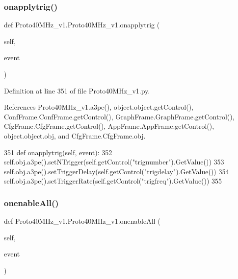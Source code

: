 \subsubsection{\texorpdfstring{onapplytrig()}{onapplytrig()}}
{\footnotesize\ttfamily def Proto40\+M\+Hz\+\_\+v1.\+Proto40\+M\+Hz\+\_\+v1.\+onapplytrig (\begin{DoxyParamCaption}\item[{}]{self,  }\item[{}]{event }\end{DoxyParamCaption})}



Definition at line 351 of file Proto40\+M\+Hz\+\_\+v1.\+py.



References Proto40\+M\+Hz\+\_\+v1.\+a3pe(), object.\+object.\+get\+Control(), Conf\+Frame.\+Conf\+Frame.\+get\+Control(), Graph\+Frame.\+Graph\+Frame.\+get\+Control(), Cfg\+Frame.\+Cfg\+Frame.\+get\+Control(), App\+Frame.\+App\+Frame.\+get\+Control(), object.\+object.\+obj, and Cfg\+Frame.\+Cfg\+Frame.\+obj.


\begin{DoxyCode}
351     \textcolor{keyword}{def }onapplytrig(self, event):
352         self.obj.a3pe().setNTrigger(self.getControl(\textcolor{stringliteral}{"trignumber"}).GetValue())
353         self.obj.a3pe().setTriggerDelay(self.getControl(\textcolor{stringliteral}{"trigdelay"}).GetValue())
354         self.obj.a3pe().setTriggerRate(self.getControl(\textcolor{stringliteral}{"trigfreq"}).GetValue())
355 
\end{DoxyCode}
\mbox{\label{classProto40MHz__v1_1_1Proto40MHz__v1_a942b2d6f638b5966874437390f11890d}} 
\subsubsection{\texorpdfstring{onenable\+All()}{onenableAll()}}
{\footnotesize\ttfamily def Proto40\+M\+Hz\+\_\+v1.\+Proto40\+M\+Hz\+\_\+v1.\+onenable\+All (\begin{DoxyParamCaption}\item[{}]{self,  }\item[{}]{event }\end{DoxyParamCaption})}



